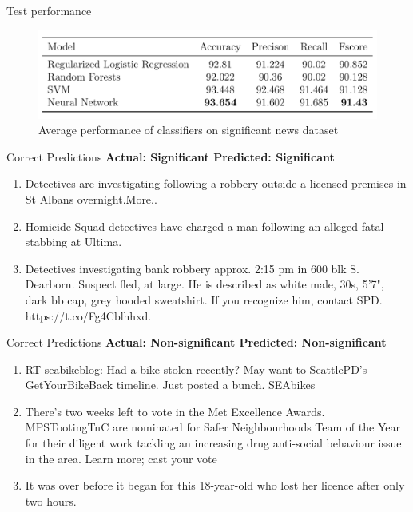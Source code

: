 \documentclass[12pt]{beamer}
\begin{document}
\begin{frame}{Test performance}
\begin{figure}[h]
    \includegraphics[width=\textwidth]{images/avg_performance.png}
    \caption{Average performance of classifiers on significant news dataset}
    \label{tbl:average_performance}
\end{figure}
\end{frame}

\begin{frame}{Correct Predictions}
    \textbf{Actual: Significant \hfill Predicted: Significant}
    \begin{enumerate}
        \item Detectives are investigating following a robbery outside a licensed premises in St Albans overnight.More..
        \item Homicide Squad detectives have charged a man following an alleged fatal stabbing at Ultima.
        \item Detectives investigating bank robbery approx. 2:15 pm in 600 blk S. Dearborn.  Suspect fled, at large. He is described as white male, 30s, 5'7", dark bb cap, grey hooded sweatshirt. If you recognize him, contact SPD. https://t.co/Fg4Cblhhxd.
    \end{enumerate}
\end{frame}

\begin{frame}{Correct Predictions}
    \textbf{Actual: Non-significant \hfill Predicted: Non-significant}
    \begin{enumerate}
        \item RT seabikeblog: Had a bike stolen recently? May want to SeattlePD’s GetYourBikeBack timeline. Just posted a bunch. SEAbikes
        \item There's two weeks left to vote in the Met Excellence Awards. MPSTootingTnC are nominated for Safer Neighbourhoods Team of the Year for their diligent work tackling an increasing drug anti-social behaviour issue in the area. Learn more; cast your vote
        \item It was over before it began for this 18-year-old who lost her licence after only two hours.
    \end{enumerate}
\end{frame}
\end{document}
